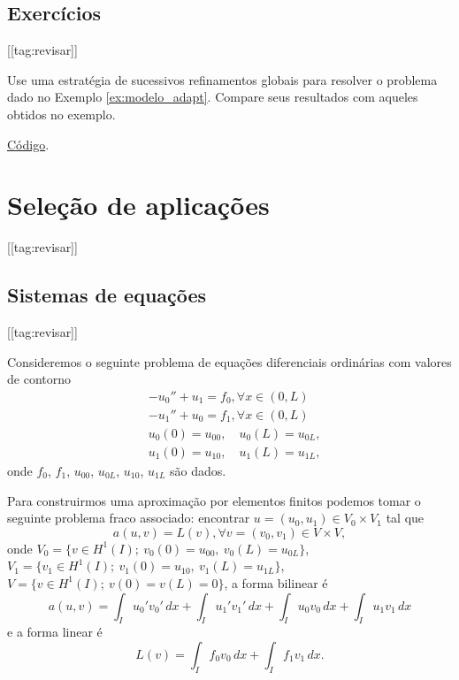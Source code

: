\subsection{Exercícios}
[[tag:revisar]]

\begin{exer}\label{exer:modelo_refglobal}
  Use uma estratégia de sucessivos refinamentos globais para resolver o problema dado no Exemplo \ref{ex:modelo_adapt}. Compare seus resultados com aqueles obtidos no exemplo.
\end{exer}
\begin{resp}
  \ifispython
  \href{https://github.com/phkonzen/notas/blob/master/src/MetodoElementosFinitos/cap_mef1d/dados/exer_dcr/exer_dcr.py}{Código}.
  \fi  
\end{resp}

\section{Seleção de aplicações}\label{cap_mef1d_sec_aps}
[[tag:revisar]]

\subsection{Sistemas de equações}
[[tag:revisar]]

Consideremos o seguinte problema de equações diferenciais ordinárias com valores de contorno
\begin{align}
  &-u_0'' + u_1 = f_0,\forall x\in (0, L)\\ 
  &-u_1'' + u_0 = f_1,\forall x\in (0, L)\\
  &u_0(0)=u_{00},\quad u_0(L)=u_{0L},\\
  &u_1(0)=u_{10},\quad u_1(L)=u_{1L},
\end{align}
onde $f_0$, $f_1$, $u_{00}$, $u_{0L}$, $u_{10}$, $u_{1L}$ são dados.

Para construirmos uma aproximação por elementos finitos podemos tomar o seguinte problema fraco associado: encontrar $u = (u_0, u_1)\in V_0\times V_1$ tal que
\begin{equation}
  a(u, v) = L(v), \forall v = (v_0, v_1)\in V\times V,
\end{equation}
onde $V_0 = \{v\in H^1(I);~v_0(0)=u_{00},~v_0(L)=u_{0L}\}$, $V_1=\{v_1\in H^1(I);~v_1(0)=u_{10},~v_1(L)=u_{1L}\}$, $V = \{v\in H^1(I);~v(0)=v(L)=0\}$, a forma bilinear é
\begin{equation}\label{eq:sis_lin_bilinear}
  a(u, v) = \int_{I} u_0'v_0'\,dx + \int_{I} u_1'v_1'\,dx + \int_{I} u_0v_0\,dx + \int_{I} u_1v_1\,dx
\end{equation}
e a forma linear é
\begin{equation}\label{eq:sis_lin_linear}
  L(v) = \int_I f_0v_0\,dx + \int_I f_1v_1\,dx.
\end{equation}

